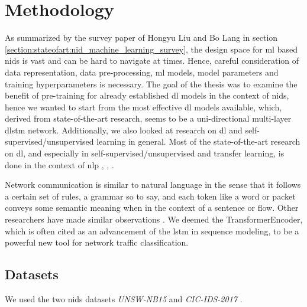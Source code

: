 \chapter{Methodology} \label{sec:methodology}

As summarized by the survey paper \cite{nid_ml_survey_2019} of Hongyu Liu and Bo Lang in section \ref{section:stateofart:nid_machine_learning_survey}, the design space for \gls{ml} based \gls{nids} is vast and can be hard to navigate at times. Hence, careful consideration of data representation, data pre-processing, \gls{ml} models, model parameters and training hyperparameters is necessary. The goal of the thesis was to examine the benefit of pre-training for already established \gls{dl} models in the context of \gls{nids}, hence we wanted to start from the most effective \gls{dl} models available, which, derived from state-of-the-art research, seems to be a uni-directional multi-layer \gls{dlstm} network. Additionally, we also looked at research on \gls{dl} and self-supervised/unsupervised learning in general. Most of the state-of-the-art research on \gls{dl}, and especially in self-supervised/unsupervised and transfer learning, is done in the context of \gls{nlp} \cite{bert}, \cite{elmo}, \cite{attention}.

Network communication is similar to natural language in the sense that it follows a certain set of rules, a grammar so to say, and each token like a word or packet conveys some semantic meaning when in the context of a sentence or flow. Other researchers have made similar observations \cite{anomaly_detection_recurrent_neural_networks}. We deemed the TransformerEncoder, which is often cited as an advancement of the \gls{lstm} in sequence modeling, to be a powerful new tool for network traffic classification. 

\section{Datasets} \label{sec:methodology:datasets}

We used the two \gls{nids} datasets \textit{UNSW-NB15} \cite{unsw_nb15} and \textit{CIC-IDS-2017} \cite{cic_ids_2017}. \par

